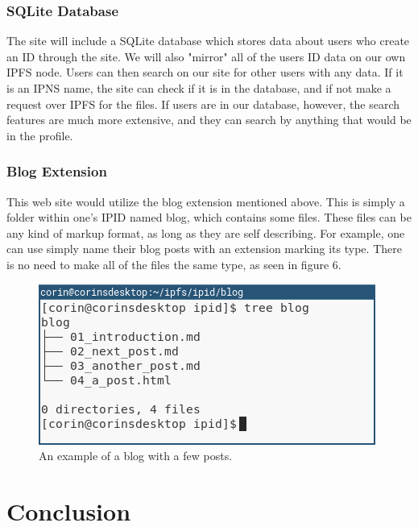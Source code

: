 \documentclass{article}
\begin{document}
\subsubsection{SQLite Database}

The site will include a SQLite database which stores data about users who create an ID through the site. We will also "mirror" all of the users ID data on our own IPFS node. Users can then search on our site for other users with any data. If it is an IPNS name, the site can check if it is in the database, and if not make a request over IPFS for the files. If users are in our database, however, the search features are much more extensive, and they can search by anything that would be in the profile. 

\subsubsection{Blog Extension}

This web site would utilize the blog extension mentioned above. This is simply a folder within one's IPID named blog, which contains some files. These files can be any kind of markup format, as long as they are self describing. For example, one can use simply name their blog posts with an extension marking its type. There is no need to make all of the files the same type, as seen in figure 6. 

\begin{figure}[h]
  \centering
  \includegraphics[width=.75\linewidth]{resources/blog_example.png}
  \caption{An example of a blog with a few posts.}
\end{figure}

\section{Conclusion}
\end{document}
